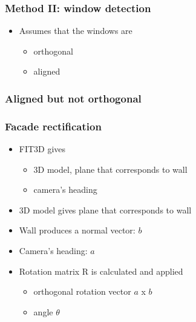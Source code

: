 \documentclass{beamer}
\begin{document}
\frame
{
	\frametitle{Method II: window detection}
	\begin{itemize}
	\item <+-| alert@+> Assumes that the windows are
	\begin{itemize}
		\item <+-| alert@+> orthogonal
		\item <+-| alert@+> aligned
	\end{itemize}
	\end{itemize}

}

\frame
{
	\frametitle{Aligned but not orthogonal}
}

\frame
{
	\frametitle{Facade rectification}
	\begin{itemize}
		\item <+-| alert@+> FIT3D gives
			\begin{itemize}
			\item <+-| alert@+> 3D model, plane that corresponds to wall
			\item <+-| alert@+> camera's heading
			\end{itemize}
		\item <+-| alert@+> 3D model gives plane that corresponds to wall
		\item <+-| alert@+> Wall produces a normal vector:  $b$
		\item <+-| alert@+> Camera's heading: $a$
		\item <+-| alert@+> Rotation matrix R is calculated and applied
			\begin{itemize}
			\item <+-| alert@+> orthogonal rotation vector $a$ x $b$
			\item <+-| alert@+> angle $\theta$
			\end{itemize}
	\end{itemize}
}
\end{document}
